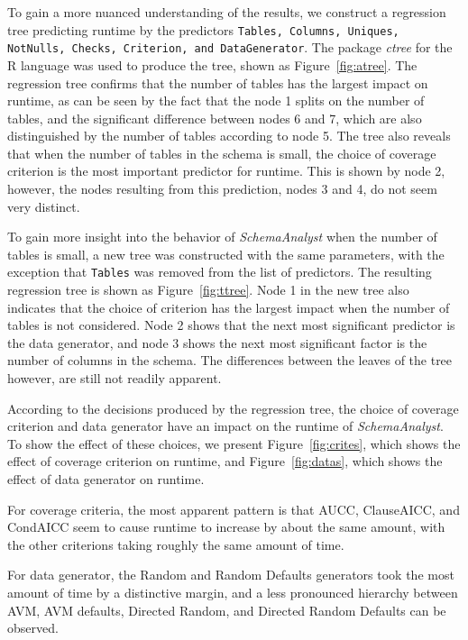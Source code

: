 To gain a more nuanced understanding of the results, we construct a
regression tree predicting runtime by the predictors \texttt{Tables,
Columns, Uniques, NotNulls, Checks, Criterion, and DataGenerator}. The
package \textit{ctree} for the R language was used to produce the tree,
shown as Figure~\ref{fig:atree}. The regression tree confirms that the
number of tables has the largest impact on runtime, as can be seen by
the fact that the node 1 splits on the number of tables, and the
significant difference between nodes 6 and 7, which are also
distinguished by the number of tables according to node 5. The tree also
reveals that when the number of tables in the schema is small, the
choice of coverage criterion is the most important predictor for
runtime.  This is shown by node 2, however, the nodes resulting from this
prediction, nodes 3 and 4, do not seem very distinct.  

To gain more insight into the behavior of \textit{SchemaAnalyst} when
the number of tables is small, a new tree was constructed with the same
parameters, with the exception that \texttt{Tables} was removed from
the list of predictors. The resulting regression tree is shown as
Figure~\ref{fig:ttree}.  Node 1 in the new tree also indicates that
the choice of criterion has the largest impact when the number of tables
is not considered.  Node 2 shows that the next most significant
predictor is the data generator, and node 3 shows the next most
significant factor is the number of columns in the schema.  The
differences between the leaves of the tree however, are still not
readily apparent. 

According to the decisions produced by the regression tree, the choice
of coverage criterion and data generator have an impact on the runtime
of \textit{SchemaAnalyst}. To show the effect of these choices, we
present Figure~\ref{fig:crites}, which shows the effect of coverage
criterion on runtime, and Figure~\ref{fig:datas}, which shows the effect
of data generator on runtime.  

For coverage criteria, the most apparent pattern is that AUCC,
ClauseAICC, and CondAICC seem to cause runtime to increase by about the
same amount, with the other criterions taking roughly the same amount of
time.

For data generator, the Random and Random Defaults generators took the
most amount of time by a distinctive margin, and a less pronounced
hierarchy between AVM, AVM defaults, Directed Random, and Directed
Random Defaults can be observed.  

